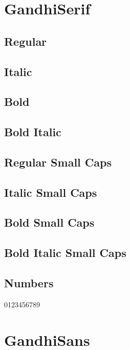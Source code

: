 \documentclass{article}
\begin{document}
\section{GandhiSerif}
\subsection*{Regular}
\lipsum[1]

\subsection*{Italic}
\textit{\lipsum[2]}


\subsection*{Bold}
\textbf{\lipsum[3]}

\subsection*{Bold Italic}

\textbf{\textit{\lipsum[4]}}


\subsection*{Regular Small Caps}
\textsc{\lipsum[1]}

\subsection*{Italic Small Caps}
\textsc{\textit{\lipsum[2]}}


\subsection*{Bold Small Caps}
\textsc{\textbf{\lipsum[3]}}

\subsection*{Bold Italic Small Caps}

\textsc{\textbf{\textit{\lipsum[4]}}}

\subsection*{Numbers}

0123456789

\section{GandhiSans}\sf
\end{document}
